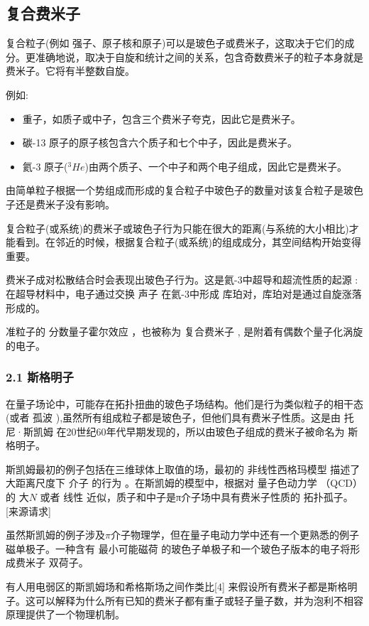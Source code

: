 \subsection{ 复合费米子}
复合粒子(例如 强子、原子核和原子)可以是玻色子或费米子，这取决于它们的成分。更准确地说，取决于自旋和统计之间的关系，包含奇数费米子的粒子本身就是费米子。它将有半整数自旋。

例如:
\begin{itemize}
\item 重子，如质子或中子，包含三个费米子夸克，因此它是费米子。
\item 碳-13 原子的原子核包含六个质子和七个中子，因此是费米子。
\item 氦-3 原子($^3He$)由两个质子、一个中子和两个电子组成，因此它是费米子。
\end{itemize}
由简单粒子根据一个势组成而形成的复合粒子中玻色子的数量对该复合粒子是玻色子还是费米子没有影响。

复合粒子(或系统)的费米子或玻色子行为只能在很大的距离(与系统的大小相比)才能看到。在邻近的时候，根据复合粒子(或系统)的组成成分，其空间结构开始变得重要。

费米子成对松散结合时会表现出玻色子行为。这是氦-3中超导和超流性质的起源 :在超导材料中，电子通过交换 声子 在氦-3中形成 库珀对，库珀对是通过自旋涨落形成的。

准粒子的 分数量子霍尔效应 ，也被称为 复合费米子 , 是附着有偶数个量子化涡旋的电子。

\subsubsection{2.1 斯格明子}
在量子场论中，可能存在拓扑扭曲的玻色子场结构。他们是行为类似粒子的相干态(或者 孤波 ),虽然所有组成粒子都是玻色子，但他们具有费米子性质。这是由 托尼·斯凯姆 在20世纪60年代早期发现的，所以由玻色子组成的费米子被命名为 斯格明子。

斯凯姆最初的例子包括在三维球体上取值的场，最初的 非线性西格玛模型 描述了大距离尺度下 介子 的行为 。在斯凯姆的模型中，根据对 量子色动力学 （QCD）的 大$N$ 或者 线性 近似，质子和中子是π介子场中具有费米子性质的 拓扑孤子。[来源请求]

虽然斯凯姆的例子涉及$\pi$介子物理学，但在量子电动力学中还有一个更熟悉的例子 磁单极子。一种含有 最小可能磁荷 的玻色子单极子和一个玻色子版本的电子将形成费米子 双荷子。

有人用电弱区的斯凯姆场和希格斯场之间作类比[4] 来假设所有费米子都是斯格明子。这可以解释为什么所有已知的费米子都有重子或轻子量子数，并为泡利不相容原理提供了一个物理机制。

